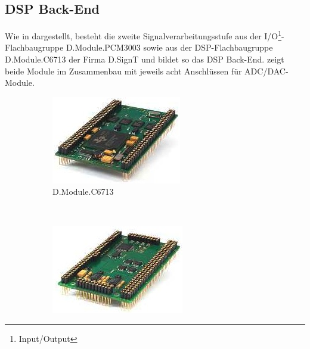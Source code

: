 \subsection{DSP Back-End}
Wie in  dargestellt, besteht die zweite Signalverarbeitungsstufe aus der I/O\footnote{Input/Output}-Flachbaugruppe D.Module.PCM3003 sowie aus der DSP-Flachbaugruppe D.Module.C6713 der Firma D.SignT und bildet so das DSP Back-End.  zeigt beide Module im Zusammenbau mit jeweils acht Anschlüssen für ADC/DAC-Module.


\begin{figure}
        \centering
        \begin{subfigure}[b]{0.48\textwidth}
                \centering
                \includegraphics[width=\textwidth]{images/03_Realisierung/DSP6713}
                \caption{D.Module.C6713}
                \label{fig:D.Module.C6713}
        \end{subfigure}
        ~ %
        \begin{subfigure}[b]{0.48\textwidth}
                \centering
                \includegraphics[width=\textwidth]{images/03_Realisierung/PCM3003}

\end{subfigure}
\end{figure}
